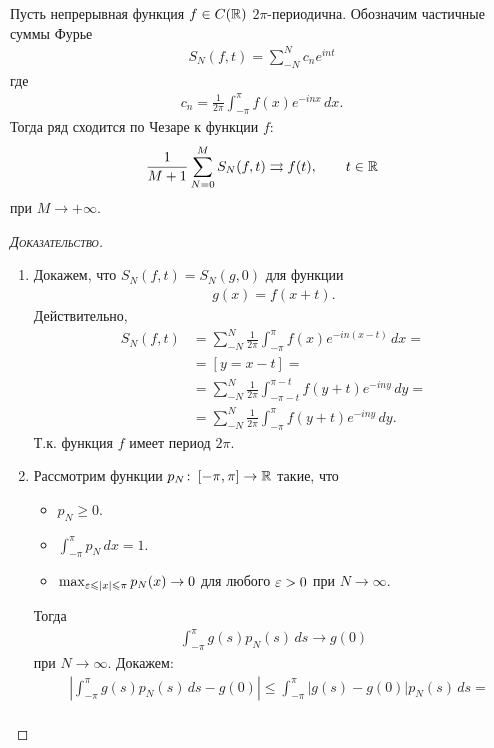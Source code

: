 \documentclass[../complex-analysis.tex]{subfiles}
\begin{document}
\begin{thm}[Фейера]
 Пусть непрерывная функция $ f \in C(\mathbb{R}) $ $ 2\pi $-периодична. Обозначим частичные суммы Фурье
 \begin{align*}
  S_{N} (f,t) = \sum_{-N}^{N} c_ne^{int}
 \end{align*} где
 \begin{align*}
  c_n = \frac{1}{2\pi} \int_{-\pi}^{\pi} f(x)e^{-inx}\,dx.
 \end{align*} Тогда ряд сходится по Чезаре к функции $ f $:
 \begin{align*}
  \frac{1}{M+1} \sum_{N=0}^{M} S_N(f,t) \rightrightarrows f(t), \qquad t \in \mathbb{R}
 \end{align*} при $ M \to + \infty$.
\end{thm}
\begin{proof}[\normalfont\textsc{Доказательство}]\
 \begin{enumerate}
  \item Докажем, что $ S_N(f,t) = S_N(g, 0) $ для функции
    \begin{align*}
    g(x) = f(x + t).
   \end{align*} Действительно,
   \begin{align*}
    S_N(f,t) &= \sum_{-N}^{N} \frac{1}{2\pi} \int_{-\pi}^{\pi} f(x)e^{-in(x-t)}\,dx =  \\
	&= [y = x - t] = \\
    &= \sum_{-N}^{N} \frac{1}{2\pi} \int_{-\pi - t}^{\pi - t} f(y + t)e^{-iny}\,dy = \\
    &= \sum_{-N}^{N}\frac{1}{2\pi} \int_{-\pi}^{\pi} f(y+t)e^{-iny}\,dy.
\end{align*} Т.к. функция $f$ имеет период $2 \pi$.  
  \item Рассмотрим функции $ p_N \colon\, [-\pi,\pi] \to \mathbb{R} $ такие, что
   \begin{itemize}
    \item $ p_N \geqslant 0 $.
    \item $ \int_{-\pi}^{\pi} p_N\,dx = 1  $.
    \item $ \max_{ \varepsilon \leqslant \left| x \right| \leqslant \pi } p_N(x) \to 0 $ для любого $ \varepsilon > 0 $ при $ N \to \infty $.
   \end{itemize} Тогда 
   \begin{align*}
    \int_{-\pi}^{\pi} g(s)p_N(s)\,ds \to g(0)
   \end{align*} при $ N \to \infty $. Докажем:
   \begin{align*}
    &\left|\int_{-\pi}^{\pi} g(s)p_N(s)\,ds - g(0) \right| \leqslant \int_{-\pi}^{\pi} \left| g(s) - g(0) \right|p_N(s)\,ds = \\

\end{align*}
\end{enumerate}
\end{proof}
\end{document}
